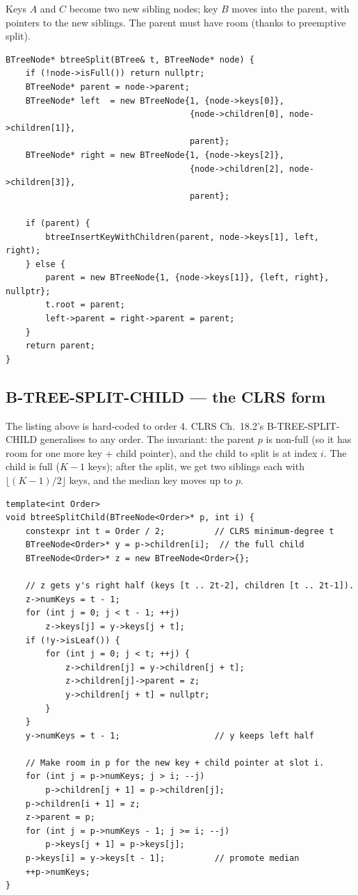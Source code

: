 \documentclass[11pt]{article}
\begin{document}
Keys $A$ and $C$ become two new sibling nodes; key $B$ moves into the parent, with pointers to the new siblings. The parent must have room (thanks to preemptive split).

\begin{lstlisting}[basicstyle=\ttfamily\small,frame=single]
BTreeNode* btreeSplit(BTree& t, BTreeNode* node) {
    if (!node->isFull()) return nullptr;
    BTreeNode* parent = node->parent;
    BTreeNode* left  = new BTreeNode{1, {node->keys[0]},
                                     {node->children[0], node->children[1]},
                                     parent};
    BTreeNode* right = new BTreeNode{1, {node->keys[2]},
                                     {node->children[2], node->children[3]},
                                     parent};

    if (parent) {
        btreeInsertKeyWithChildren(parent, node->keys[1], left, right);
    } else {
        parent = new BTreeNode{1, {node->keys[1]}, {left, right}, nullptr};
        t.root = parent;
        left->parent = right->parent = parent;
    }
    return parent;
}
\end{lstlisting}

\subsection*{B-TREE-SPLIT-CHILD --- the CLRS form}

The listing above is hard-coded to order 4. CLRS Ch.~18.2's
B-TREE-SPLIT-CHILD generalises to any order. The invariant: the
parent $p$ is non-full (so it has room for one more key + child
pointer), and the child to split is at index $i$. The child is full
($K-1$ keys); after the split, we get two siblings each with
$\lfloor (K-1)/2 \rfloor$ keys, and the median key moves up to $p$.

\begin{lstlisting}[basicstyle=\ttfamily\small,frame=single]
template<int Order>
void btreeSplitChild(BTreeNode<Order>* p, int i) {
    constexpr int t = Order / 2;          // CLRS minimum-degree t
    BTreeNode<Order>* y = p->children[i];  // the full child
    BTreeNode<Order>* z = new BTreeNode<Order>{};

    // z gets y's right half (keys [t .. 2t-2], children [t .. 2t-1]).
    z->numKeys = t - 1;
    for (int j = 0; j < t - 1; ++j)
        z->keys[j] = y->keys[j + t];
    if (!y->isLeaf()) {
        for (int j = 0; j < t; ++j) {
            z->children[j] = y->children[j + t];
            z->children[j]->parent = z;
            y->children[j + t] = nullptr;
        }
    }
    y->numKeys = t - 1;                   // y keeps left half

    // Make room in p for the new key + child pointer at slot i.
    for (int j = p->numKeys; j > i; --j)
        p->children[j + 1] = p->children[j];
    p->children[i + 1] = z;
    z->parent = p;
    for (int j = p->numKeys - 1; j >= i; --j)
        p->keys[j + 1] = p->keys[j];
    p->keys[i] = y->keys[t - 1];          // promote median
    ++p->numKeys;
}
\end{lstlisting}
\end{document}
